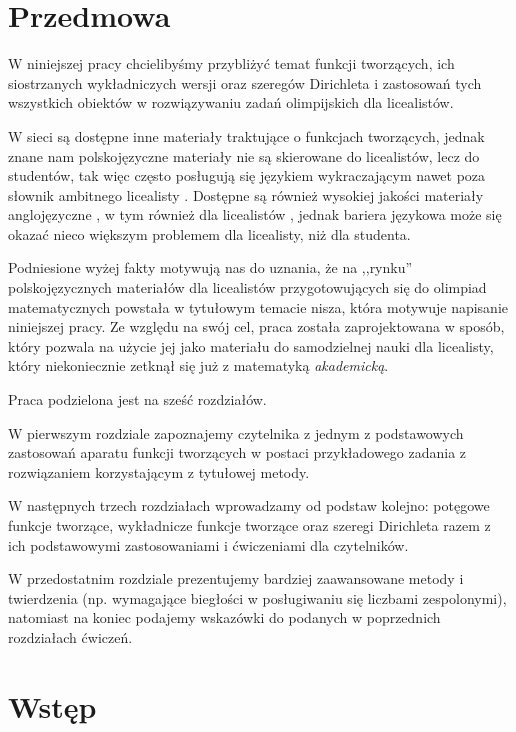\documentclass[shortabstract]{imthesis}
\author         {Bartosz Chomiński}
\date           {12 czerwca 2024}
\begin{document}
\setcounter{chapter}{-1}
\chapter{Przedmowa}

W niniejszej pracy chcielibyśmy przybliżyć temat funkcji tworzących, ich siostrzanych wykładniczych wersji oraz szeregów Dirichleta i zastosowań tych wszystkich obiektów w rozwiązywaniu zadań olimpijskich dla licealistów. 

W sieci są dostępne inne materiały traktujące o funkcjach tworzących, jednak znane nam polskojęzyczne materiały nie są skierowane do licealistów, lecz do studentów, tak więc często posługują się językiem wykraczającym nawet poza słownik ambitnego licealisty \cite{guzicki,sarbicki}. Dostępne są również wysokiej jakości materiały anglojęzyczne \cite{wilf1990generatingfunctionology,goemans}, w tym również dla licealistów \cite{evan,novakovic,zhao}, jednak bariera językowa może się okazać nieco większym problemem dla licealisty, niż dla studenta. 

Podniesione wyżej fakty motywują nas do uznania, że na ,,rynku'' polskojęzycznych materiałów dla licealistów przygotowujących się do olimpiad matematycznych powstała w tytułowym temacie nisza, która motywuje napisanie niniejszej pracy. Ze względu na swój cel, praca została zaprojektowana w sposób, który pozwala na użycie jej jako materiału do samodzielnej nauki dla licealisty, który niekoniecznie zetknął się już z matematyką \emph{akademicką}.

Praca podzielona jest na sześć rozdziałów.

W pierwszym rozdziale zapoznajemy czytelnika z jednym z podstawowych zastosowań aparatu funkcji tworzących w postaci przykładowego zadania z rozwiązaniem korzystającym z tytułowej metody.

W następnych trzech rozdziałach wprowadzamy od podstaw kolejno: potęgowe funkcje tworzące, wykładnicze funkcje tworzące oraz szeregi Dirichleta razem z ich podstawowymi zastosowaniami i ćwiczeniami dla czytelników.

W przedostatnim rozdziale prezentujemy bardziej zaawansowane metody i twierdzenia (np. wymagające biegłości w posługiwaniu się liczbami zespolonymi), natomiast na koniec podajemy wskazówki do podanych w poprzednich rozdziałach ćwiczeń.

\chapter{Wstęp}
\end{document}
